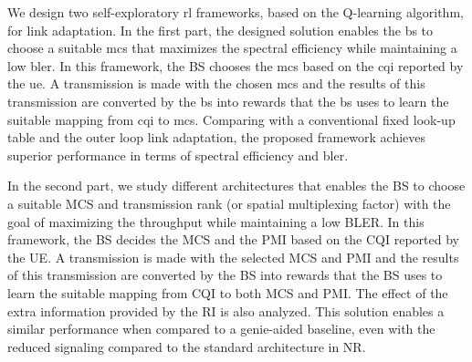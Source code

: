 \begin{resumo}

\setlength\parindent{24pt}
We design two self-exploratory \gls{rl} frameworks, based on the Q-learning algorithm, for link adaptation.
%
In the first part, the designed solution enables the \gls{bs} to choose a suitable \gls{mcs} that maximizes the spectral efficiency while maintaining a low \gls{bler}.
%
In this framework, the BS chooses the \gls{mcs} based on the \gls{cqi} reported by the \gls{ue}.
%
A transmission is made with the chosen \gls{mcs} and the results of this transmission are converted by the \gls{bs} into rewards that the \gls{bs} uses to learn the suitable mapping from \gls{cqi} to \gls{mcs}.
%
Comparing with a conventional fixed look-up table and the outer loop link adaptation, the proposed framework achieves superior performance in terms of spectral efficiency and \gls{bler}.

In the second part, we study different architectures that enables the BS to choose a suitable MCS and transmission rank (or spatial multiplexing factor) with the goal of maximizing the throughput while maintaining a low BLER.
%
In this framework, the BS decides the MCS and the PMI based on the CQI reported by the UE.
%
A transmission is made with the selected MCS and PMI and the results of this transmission are converted by the BS into rewards that the BS uses to learn the suitable mapping from CQI to both MCS and PMI.
%
The effect of the extra information provided by the RI is also analyzed.
%
This solution enables a similar performance when compared to a genie-aided baseline, even with the reduced signaling compared to the standard architecture in NR.


\end{resumo}
